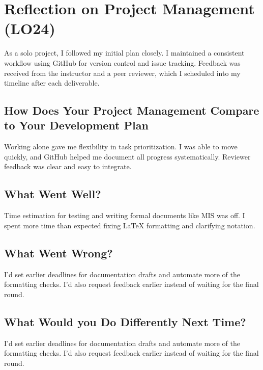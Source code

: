 \documentclass{article}
\begin{document}
\section{Reflection on Project Management (LO24)}
As a solo project, I followed my initial plan closely. I maintained a consistent
workflow using GitHub for version control and issue tracking. Feedback was
received from the instructor and a peer reviewer, which I scheduled into my
timeline after each deliverable.

\subsection{How Does Your Project Management Compare to Your Development Plan}
Working alone gave me flexibility in task prioritization. I was able to move
quickly, and GitHub helped me document all progress systematically. Reviewer
feedback was clear and easy to integrate.

\subsection{What Went Well?}

Time estimation for testing and writing formal documents like MIS was off. I spent more time than expected fixing LaTeX formatting and clarifying notation.

\subsection{What Went Wrong?}

I'd set earlier deadlines for documentation drafts and automate more of the formatting checks. I'd also request feedback earlier instead of waiting for the final round.

\subsection{What Would you Do Differently Next Time?}
I'd set earlier deadlines for documentation drafts and automate more of the
formatting checks. I'd also request feedback earlier instead of waiting for the
final round.
\end{document}
